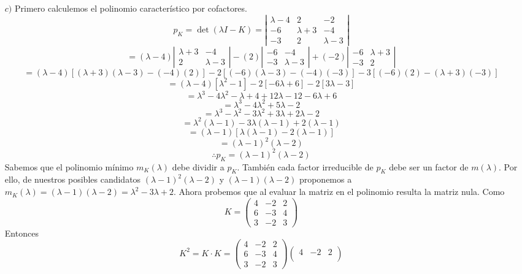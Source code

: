 \begin{enumerate}
	
	
\item[$c)$] Primero calculemos el polinomio característico por cofactores.
\[ p_K=\det( \lambda I-K)= \left| \begin{array}{ccc}	
\lambda-4 & 2 & -2\\
-6 & \lambda +3 & -4\\
-3 & 2 & \lambda - 3 \end{array} \right| \]
\[ = (\lambda -4)\left| \begin{array}{cc}	
\lambda+3 & -4\\
2 & \lambda -3
\end{array} \right| - (2)\left| \begin{array}{cc}	
-6 & -4\\
-3 & \lambda -3
\end{array} \right| + (-2)\left| \begin{array}{cc}	
-6 & \lambda +3\\
-3 & 2
\end{array} \right|\] \[=(\lambda -4)[(\lambda +3)(\lambda -3)-(-4)(2)] -2[(-6)(\lambda -3)-(-4)(-3)] -3[(-6)(2)-(\lambda +3)(-3)]\] \[=(\lambda -4)[\lambda ^2-1]-2[-6\lambda +6]-2[3\lambda -3]\] \[=\lambda ^3-4\lambda ^2-\lambda +4+12\lambda -12-6\lambda +6\] \[=\lambda ^3 -4\lambda ^2+5\lambda -2\] \[=\lambda ^3-\lambda ^2-3\lambda ^2+3\lambda +2\lambda -2\] \[=\lambda ^2(\lambda -1)-3\lambda(\lambda -1)+2(\lambda -1)\]\[=(\lambda -1)[\lambda (\lambda -1)-2(\lambda -1)]\] \[=(\lambda -1)^2(\lambda -2)\]\[\therefore p_K = (\lambda -1)^2(\lambda -2)\]
Sabemos que el polinomio mínimo $m_K(\lambda)$ debe dividir a $p_K$. También cada factor irreducible de $p_K$ debe ser un factor de $m(\lambda)$. Por ello, de nuestros posibles candidatos $(\lambda -1)^2(\lambda -2)$ y $(\lambda -1)(\lambda -2)$ proponemos a $m_K(\lambda)=(\lambda -1)(\lambda -2)=\lambda ^2-3\lambda +2$. Ahora probemos que al evaluar la matriz en el polinomio resulta la matriz nula.
Como
\[K = \begin{pmatrix}
	4 & -2 & 2 \\
	6 & -3 & 4 \\
	3 & -2 & 3\end{pmatrix}\]
Entonces
\[K^2=K\cdot K=\begin{pmatrix}
	4 & -2 & 2 \\
	6 & -3 & 4 \\
	3 & -2 & 3\end{pmatrix}\begin{pmatrix}
	4 & -2 & 2 \\

\end{pmatrix}\]
\end{enumerate}
